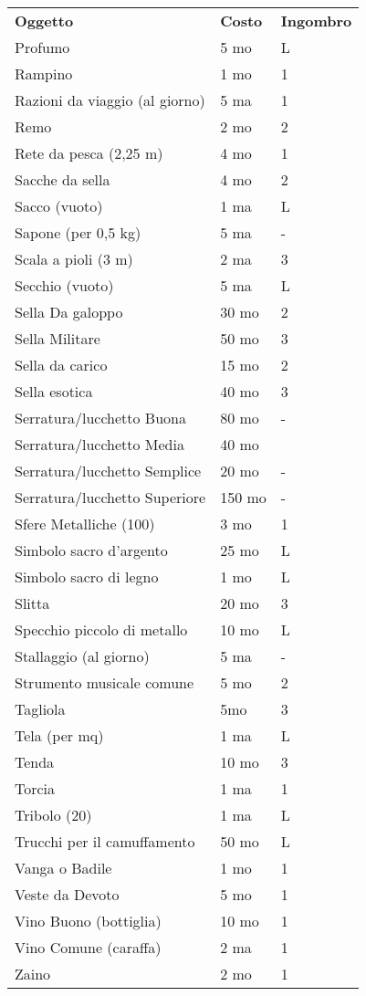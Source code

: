 \documentclass[12pt,a4paper,twoside,openany]{book}
\begin{document}
\begin{multicols}{2}
{\begin{tabularx}{0.42\textwidth}{lll}
\textbf{Oggetto}    & \textbf{Costo} & \textbf{Ingombro}\\
Profumo & 5 mo & L\\
Rampino & 1 mo& 1 \\
Razioni da viaggio (al giorno)  & 5 ma& 1 \\
Remo  & 2 mo& 2\\
Rete da pesca (2,25 m)& 4 mo& 1 \\
Sacche da sella & 4 mo& 2\\
Sacco (vuoto) & 1 ma& L \\
Sapone (per 0,5 kg) & 5 ma& - \\
Scala a pioli (3 m) & 2 ma& 3 \\
Secchio (vuoto)& 5 ma& L\\
Sella Da galoppo  & 30 mo& 2\\
Sella Militare  & 50 mo  & 3\\
Sella da carico & 15 mo  & 2\\
Sella esotica& 40 mo& 3\\
Serratura/lucchetto Buona & 80 mo  & -\\
Serratura/lucchetto Media & 40 mo&  \\
Serratura/lucchetto Semplice& 20 mo  & -\\
Serratura/lucchetto Superiore& 150 mo  & - \\
Sfere Metalliche (100) & 3 mo & 1\\
Simbolo sacro d'argento & 25 mo& L\\
Simbolo sacro di legno  & 1 mo& L\\
Slitta& 20 mo  & 3 \\
Specchio piccolo di metallo & 10 mo  & L\\
Stallaggio (al giorno)  & 5 ma& -\\
Strumento musicale comune& 5 mo& 2\\
Tagliola& 5mo&3\\
Tela (per mq)& 1 ma& L \\
Tenda & 10 mo  & 3 \\
Torcia& 1 ma& 1\\
Tribolo (20) & 1 ma& L \\
Trucchi per il camuffamento & 50 mo& L\\
Vanga o Badile & 1 mo&1\\
Veste da Devoto & 5 mo& 1\\
Vino Buono (bottiglia) & 10 mo& 1\\
Vino Comune (caraffa)  & 2 ma& 1\\
Zaino & 2 mo& 1 \\
\end{tabularx}}



\end{multicols}
\end{document}
